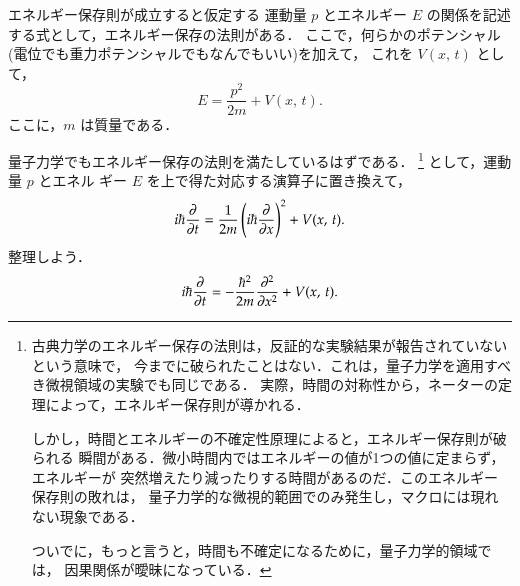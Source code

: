             \begin{mysmallsec}{エネルギー保存則が成立すると仮定する}
            運動量 $p$ とエネルギー $E$ の関係を記述する式として，エネルギー保存の法則がある．
            ここで，何らかのポテンシャル(電位でも重力ポテンシャルでもなんでもいい)を加えて，
            これを $V(x,\,t)$ として，
                \begin{equation*}
                    E = \frac{p^{2}}{2m} + V(x,\,t).
                \end{equation*}
            ここに，$m$ は質量である．

            量子力学でもエネルギー保存の法則を満たしているはずである．
                \footnote{
                    古典力学のエネルギー保存の法則は，反証的な実験結果が報告されていないという意味で，
                    今までに破られたことはない．これは，量子力学を適用すべき微視領域の実験でも同じである．
                    実際，時間の対称性から，ネーターの定理によって，エネルギー保存則が導かれる．

                    しかし，時間とエネルギーの不確定性原理によると，エネルギー保存則が破られる
                    瞬間がある．微小時間内ではエネルギーの値が1つの値に定まらず，エネルギーが
                    突然増えたり減ったりする時間があるのだ．このエネルギー保存則の敗れは，
                    量子力学的な微視的範囲でのみ発生し，マクロには現れない現象である．

                    ついでに，もっと言うと，時間も不確定になるために，量子力学的領域では，
                    因果関係が曖昧になっている．
                }
            として，運動量 $p$ とエネル
            ギー $E$ を上で得た対応する演算子に置き換えて，
                \begin{equation*}
                    i\hbar\frac{\partial }{\partial t}
                        = \frac{1}{2m}\left( i\hbar\frac{\partial }{\partial x} \right)^{2} + V(x,\,t).
                \end{equation*}
            整理しよう．
            \begin{equation*}
                i\hbar\frac{\partial }{\partial t}
                    = -\frac{\hbar^{2}}{2m}\frac{\partial^{2}}{\partial x^{2}} + V(x,\,t).
            \end{equation*}
            \end{mysmallsec}

